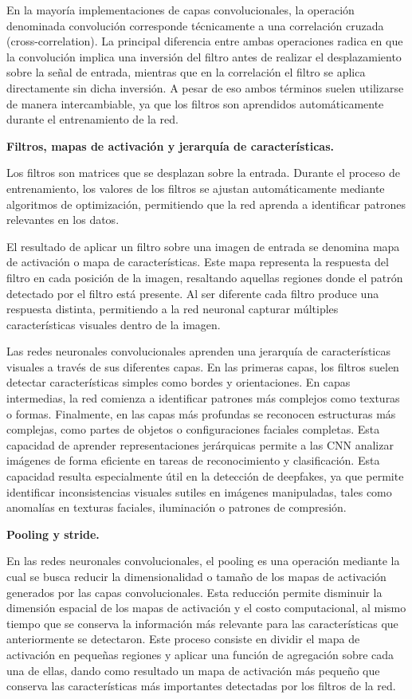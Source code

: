 En la mayoría implementaciones de capas convolucionales, la operación denominada convolución corresponde técnicamente a una correlación cruzada (cross-correlation). La principal diferencia entre ambas operaciones radica en que la convolución implica una inversión del filtro antes de realizar el desplazamiento sobre la señal de entrada, mientras que en la correlación el filtro se aplica directamente sin dicha inversión. A pesar de eso ambos términos suelen utilizarse de manera intercambiable, ya que los filtros son aprendidos automáticamente durante el entrenamiento de la red\parencite{goodfellow2016deep}.

\medskip\textbf{Filtros, mapas de activación y jerarquía de características.}

Los filtros son matrices que se desplazan sobre la entrada. Durante el proceso de entrenamiento, los valores de los filtros se ajustan automáticamente mediante algoritmos de optimización, permitiendo que la red aprenda a identificar patrones relevantes en los datos.

El resultado de aplicar un filtro sobre una imagen de entrada se denomina mapa de activación o mapa de características. Este mapa representa la respuesta del filtro en cada posición de la imagen, resaltando aquellas regiones donde el patrón detectado por el filtro está presente. Al ser diferente cada filtro produce una respuesta distinta, permitiendo a la red neuronal capturar múltiples características visuales dentro de la imagen.

Las redes neuronales convolucionales aprenden una jerarquía de características visuales a través de sus diferentes capas. En las primeras capas, los filtros suelen detectar características simples como bordes y orientaciones. En capas intermedias, la red comienza a identificar patrones más complejos como texturas o formas. Finalmente, en las capas más profundas se reconocen estructuras más complejas, como partes de objetos o configuraciones faciales completas. Esta capacidad de aprender representaciones jerárquicas permite a las CNN analizar imágenes de forma eficiente en tareas de reconocimiento y clasificación.
Esta capacidad resulta especialmente útil en la detección de deepfakes, ya que permite identificar inconsistencias visuales sutiles en imágenes manipuladas, tales como anomalías en texturas faciales, iluminación o patrones de compresión.\parencite{Rossler_2019_ICCV}


\medskip\textbf{Pooling y stride.}

En las redes neuronales convolucionales, el pooling es una operación mediante la cual se busca reducir la dimensionalidad o tamaño de los mapas de activación generados por las capas convolucionales. Esta reducción permite disminuir la dimensión espacial de los mapas de activación y el costo computacional, al mismo tiempo que se conserva la información más relevante para las características que anteriormente se detectaron. Este proceso consiste en dividir el mapa de activación en pequeñas regiones y aplicar una función de agregación sobre cada una de ellas, dando como resultado un mapa de activación más pequeño que conserva las características más importantes detectadas por los filtros de la red.


